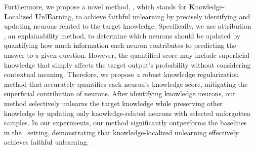 Furthermore, we propose a novel method, \textbf{\ourmodel}, which stands for \textbf{K}nowledge-\textbf{L}ocalized \textbf{U}nl\textbf{E}arning, to achieve faithful unlearning by precisely identifying and updating neurons related to the target knowledge.
Specifically, we use attribution \citep{yang2023task}, an explainability method, to determine which neurons should be updated by quantifying how much information each neuron contributes to predicting the answer to a given question.
However, the quantified score may include superficial knowledge that simply affects the target output's probability without considering contextual meaning.
Therefore, we propose a robust knowledge regularization method that accurately quantifies each neuron's knowledge score, mitigating the superficial contribution of neurons.
After identifying knowledge neurons, our method selectively unlearns the target knowledge while preserving other knowledge by updating only knowledge-related neurons with selected unforgotten samples.
In our experiments, our method significantly outperforms the baselines in the \ourdata~setting, demonstrating that knowledge-localized unlearning effectively achieves faithful unlearning.



